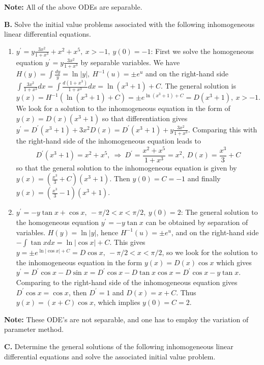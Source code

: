 \documentclass[11pt,a4paper,twoside]{article}
\begin{document}
	\textbf{Note:} All of the above ODEs are separable.\par
	\textbf{B.} Solve the initial value problems associated with the following inhomogeneous linear differential equations.
	\begin{enumerate}[\bfseries 1)]
		\item $y^\prime = y\frac{3x^2}{1+x^3} + x^2 + x^5,\ x>-1,\ y(0) = -1$: First we solve the homogeneous equation $y^\prime = y\frac{3x^2}{1+x^3}$ by separable variables. We have $H(y) = \int \frac{dy}{y} = \ln |y|,\ H^{-1}(u)=\pm e^u$ and on the right-hand side $\int \frac{3x^2}{1+x^3}dx = \int \frac{d(1+x^3)}{1+x^3}dx = \ln (x^3+1) + C$. The general solution is $y(x) = H^{-1}(\ln (x^3+1)+C) = \pm e^{\ln (x^3 + 1)+C} = D(x^3 + 1),\ x>-1$. We look for a solution to the inhomogeneous equation in the form of $y(x) = D(x)(x^3+1)$ so that differentiation gives $y^\prime = D^\prime(x^3+1)+3x^2D(x)= D^\prime (x^3+1) + y\frac{3x^2}{1+x^3}$. Comparing this with the right-hand side of the inhomogeneous equation leads to
		$$
		D^\prime(x^3+1) = x^2 + x^5,\ \Rightarrow \ D^\prime = \frac{x^2+x^5}{1+x^3} = x^2,\ D(x) = \frac{x^3}{3}+C
		$$
		so that the general solution to the inhomogeneous equation is given by $y(x) = \left(\frac{x^3}{3}+C\right)\left(x^3+1\right)$. Then $y(0) = C = -1$ and finally $y(x) = \left(\frac{x^3}{3}-1\right)\left(x^3+1\right)$.
		\item $y^\prime = -y\tan x + \cos x,\ -\pi/2 < x < \pi/2,\ y(0) = 2$: The general solution to the homogeneous equation $y^\prime = -y\tan x$ can be obtained by separation of variables. $H(y) = \ln |y|$, hence $H^{-1}(u) = \pm e^u$, and on the right-hand side $-\int \tan x dx = \ln |\cos x|+C$. This gives $y = \pm e^{\ln |\cos x|+C} = D\cos x,\ -\pi/2<x<\pi/2$, so we look for the solution to the inhomogeneous equation in the form $y(x) = D(x)\cos x$ which gives $y^\prime = D^\prime \cos x - D\sin x = D^\prime \cos x -D \tan x \cos x = D^\prime \cos x - y\tan x$. Comparing to the right-hand side of the inhomogeneous equation gives $D^\prime \cos x = \cos x$, then $D^\prime = 1$ and $D(x) = x+C$. Thus $y(x) = (x+C)\cos x$, which implies $y(0) = C = 2$.
	\end{enumerate}
	\textbf{Note:} These ODE’s are not separable, and one has to employ the variation of parameter method.\par
	\textbf{C.} Determine the general solutions of the following inhomogeneous linear differential equations and solve the associated initial value problem.
\end{document}

